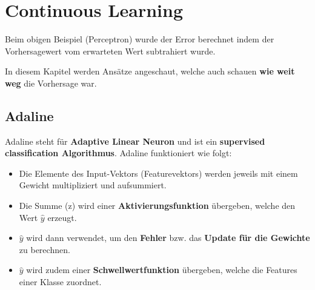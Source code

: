 \newpage
\section{Continuous Learning}
\label{sec:continuous_learning}

Beim obigen Beispiel (Perceptron) wurde der Error berechnet indem der Vorhersagewert vom erwarteten Wert subtrahiert wurde.

In diesem Kapitel werden Ansätze angeschaut, welche auch schauen \textbf{wie weit weg} die Vorhersage war.

\subsection{Adaline}

Adaline steht für \textbf{Adaptive Linear Neuron} und ist ein \textbf{supervised classification Algorithmus}. Adaline funktioniert wie folgt:

\begin{itemize}
  \item Die Elemente des Input-Vektors (Featurevektors) werden jeweils mit einem Gewicht multipliziert und aufsummiert.
  \item Die Summe (z) wird einer \textbf{Aktivierungsfunktion} übergeben, welche den Wert $\hat{y}$ erzeugt.
  \item $\hat{y}$ wird dann verwendet, um den \textbf{Fehler} bzw. das \textbf{Update für die Gewichte} zu berechnen.
  \item $\hat{y}$ wird zudem einer \textbf{Schwellwertfunktion} übergeben, welche die Features einer Klasse zuordnet.
\end{itemize}




\newcommand{\myThresholdFunction}{
\draw[thick] %
			 (-0.5em,1.25em) -- (-0.5em,-1.25em)
(-0.5em,1.25em) -- (0.5em,1.25em)
(-0.5em,-1.25em) -- (-1.5em,-1.25em)
;}


